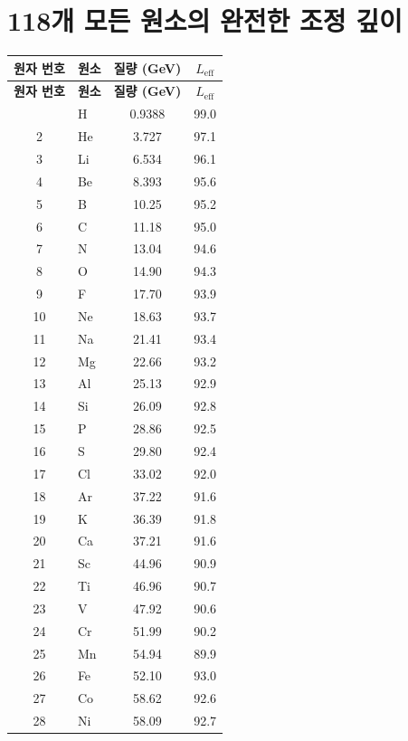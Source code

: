 \documentclass[12pt,a4paper]{article}
\begin{document}
	\section*{118개 모든 원소의 완전한 조정 깊이}
	\label{sec:full_Leff}
	\begin{longtable}{c l c c}
		\toprule
		\textbf{원자 번호} & \textbf{원소} & \textbf{질량 (GeV)} & \textbf{\(L_{\mathrm{eff}}\)} \\
		\midrule
		\endfirsthead
		\toprule
		\textbf{원자 번호} & \textbf{원소} & \textbf{질량 (GeV)} & \textbf{\(L_{\mathrm{eff}}\)} \\
		\midrule
		\endhead
		\bottomrule
		\endfoot
		1  & H   & 0.9388 & 99.0 \\
		2  & He  & 3.727  & 97.1 \\
		3  & Li  & 6.534  & 96.1 \\
		4  & Be  & 8.393  & 95.6 \\
		5  & B   & 10.25  & 95.2 \\
		6  & C   & 11.18  & 95.0 \\
		7  & N   & 13.04  & 94.6 \\
		8  & O   & 14.90  & 94.3 \\
		9  & F   & 17.70  & 93.9 \\
		10 & Ne  & 18.63  & 93.7 \\
		11 & Na  & 21.41  & 93.4 \\
		12 & Mg  & 22.66  & 93.2 \\
		13 & Al  & 25.13  & 92.9 \\
		14 & Si  & 26.09  & 92.8 \\
		15 & P   & 28.86  & 92.5 \\
		16 & S   & 29.80  & 92.4 \\
		17 & Cl  & 33.02  & 92.0 \\
		18 & Ar  & 37.22  & 91.6 \\
		19 & K   & 36.39  & 91.8 \\
		20 & Ca  & 37.21  & 91.6 \\
		21 & Sc  & 44.96  & 90.9 \\
		22 & Ti  & 46.96  & 90.7 \\
		23 & V   & 47.92  & 90.6 \\
		24 & Cr  & 51.99  & 90.2 \\
		25 & Mn  & 54.94  & 89.9 \\
		26 & Fe  & 52.10  & 93.0 \\
		27 & Co  & 58.62  & 92.6 \\
		28 & Ni  & 58.09  & 92.7 \\

\end{longtable}
\end{document}
